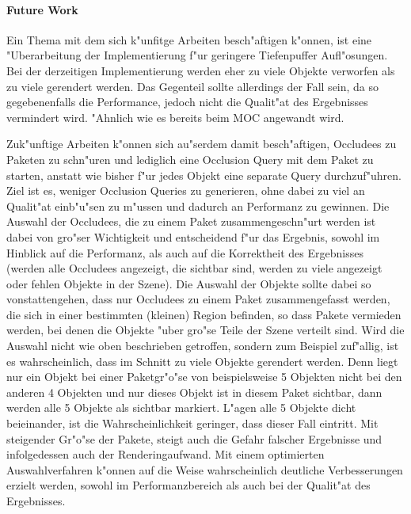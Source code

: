 \documentclass[journal]{vgtc}
\begin{document}
\paragraph{Future Work} 
Ein Thema mit dem sich k"unfitge Arbeiten besch"aftigen k"onnen, ist eine "Uberarbeitung der Implementierung f"ur geringere Tiefenpuffer Aufl"osungen.
Bei der derzeitigen Implementierung werden eher zu viele Objekte verworfen als zu viele gerendert werden.
Das Gegenteil sollte allerdings der Fall sein, da so gegebenenfalls die Performance, jedoch nicht die Qualit"at des Ergebnisses vermindert wird.
"Ahnlich wie es bereits beim MOC angewandt wird.

Zuk"unftige Arbeiten k"onnen sich au"serdem damit besch"aftigen, Occludees zu Paketen zu schn"uren und lediglich eine Occlusion Query mit dem Paket zu starten, anstatt wie bisher f"ur jedes Objekt eine separate Query durchzuf"uhren.
Ziel ist es, weniger Occlusion Queries zu generieren, ohne dabei zu viel an Qualit"at einb"u"sen zu m"ussen und dadurch an Performanz zu gewinnen.
Die Auswahl der Occludees, die zu einem Paket zusammengeschn"urt werden ist dabei von gro"ser Wichtigkeit und entscheidend f"ur das Ergebnis, sowohl im Hinblick auf die Performanz, als auch auf die Korrektheit des Ergebnisses (werden alle Occludees angezeigt, die sichtbar sind, werden zu viele angezeigt oder fehlen Objekte in der Szene).
Die Auswahl der Objekte sollte dabei so vonstattengehen, dass nur Occludees zu einem Paket zusammengefasst werden, die sich in einer bestimmten (kleinen) Region befinden, so dass Pakete vermieden werden, bei denen die Objekte "uber gro"se Teile der Szene verteilt sind.
Wird die Auswahl nicht wie oben beschrieben getroffen, sondern zum Beispiel zuf"allig, ist es wahrscheinlich, dass im Schnitt zu viele Objekte gerendert werden. Denn liegt nur ein Objekt bei einer Paketgr"o"se von beispielsweise 5 Objekten nicht bei den anderen 4 Objekten und nur dieses Objekt ist in diesem Paket sichtbar, dann werden alle 5 Objekte als sichtbar markiert. L"agen alle 5 Objekte dicht beieinander, ist die Wahrscheinlichkeit geringer, dass dieser Fall eintritt.
Mit steigender Gr"o"se der Pakete, steigt auch die Gefahr falscher Ergebnisse und infolgedessen auch der Renderingaufwand.
Mit einem optimierten Auswahlverfahren k"onnen auf die Weise wahrscheinlich deutliche Verbesserungen erzielt werden, sowohl im Performanzbereich als auch bei der Qualit"at des Ergebnisses. 



 

\end{document}
